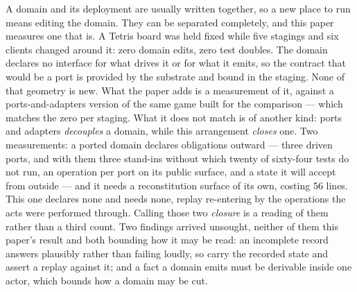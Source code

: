 \documentclass[
]{article}
\newcounter{none} %
\begin{document}
A domain and its deployment are usually written together, so a new place
to run means editing the domain. They can be separated completely, and
this paper measures one that is. A Tetris board was held fixed while
five stagings and six clients changed around it: zero domain edits, zero
test doubles. The domain declares no interface for what drives it or for
what it emits, so the contract that would be a port is provided by the
substrate and bound in the staging. None of that geometry is new. What
the paper adds is a measurement of it, against a ports-and-adapters
version of the same game built for the comparison --- which matches the
zero per staging. What it does not match is of another kind: ports and
adapters \emph{decouples} a domain, while this arrangement \emph{closes}
one. Two measurements: a ported domain declares obligations outward ---
three driven ports, and with them three stand-ins without which twenty
of sixty-four tests do not run, an operation per port on its public
surface, and a state it will accept from outside --- and it needs a
reconstitution surface of its own, costing 56 lines. This one declares
none and needs none, replay re-entering by the operations the acts were
performed through. Calling those two \emph{closure} is a reading of them
rather than a third count. Two findings arrived unsought, neither of
them this paper's result and both bounding how it may be read: an
incomplete record answers plausibly rather than failing loudly, so carry
the recorded state and assert a replay against it; and a fact a domain
emits must be derivable inside one actor, which bounds how a domain may
be cut.
\end{document}
